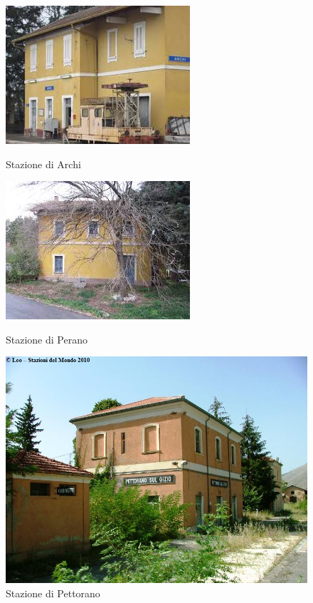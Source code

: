 \begin{figure}[h]
\centering
\begin{minipage}[c]{.40\textwidth}
\centering\setlength{\captionmargin}{0pt}%
\includegraphics[width=.60\textwidth]{img/archi}
\caption{Stazione di Archi}
\label{archi}
\end{minipage}%
\hspace{10mm}%
\begin{minipage}[c]{.40\textwidth}
\centering\setlength{\captionmargin}{0pt}%
\includegraphics[width=.60\textwidth]{img/perano}
\caption{Stazione di Perano}
\label{perano}
\end{minipage}
\begin{minipage}[c]{.40\textwidth}
\centering\setlength{\captionmargin}{0pt}%
\includegraphics[width=.60\textwidth]{img/pettorano}
\caption{Stazione di Pettorano}

\end{minipage}
\end{figure}
